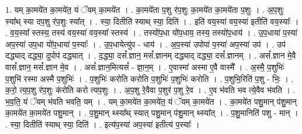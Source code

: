 \documentclass[17pt]{extarticle}
\begin{document}
1. यम् का॒मये॑त का॒मये॑त॒ यं ॅयम् का॒मये॑त । . का॒मये॑ता प॒शु र॑प॒शुः का॒मये॑त का॒मये॑ता प॒शुः । . अ॒प॒शुः स्या᳚थ् स्या दप॒शु र॑प॒शुः स्या᳚त् । . स्या॒ दितीति॑ स्याथ् स्या॒ दिति॑ । . इति॑ वय॒स्या॑ वय॒स्या॑ इतीति॑ वय॒स्याः᳚ । . व॒य॒स्या᳚ स्तस्य॒ तस्य॑ वय॒स्या॑ वय॒स्या᳚ स्तस्य॑ । . तस्यो॑प॒धा यो॑प॒धाय॒ तस्य॒ तस्यो॑प॒धाय॑ । . उ॒प॒धाया॑ प॒स्या॑ अप॒स्या॑ उप॒धा यो॑प॒धाया॑ प॒स्याः᳚ । . उ॒प॒धायेत्यु॑प - धाय॑ । . अ॒प॒स्या॑ उपोपा॑ प॒स्या॑ अप॒स्या॑ उप॑ । . उप॑ दद्ध्याद् दद्ध्या॒ दुपोप॑ दद्ध्यात् । . द॒द्ध्या॒ दसं᳚.ज्ञान॒ मसं᳚.ज्ञानम् दद्ध्याद् दद्ध्या॒ दसं᳚.ज्ञानम् । . असं᳚.ज्ञान मे॒वै वासं᳚.ज्ञान॒ मसं᳚.ज्ञान मे॒व । . असं᳚.ज्ञान॒मित्यसं᳚ - ज्ञा॒न॒म् । . ए॒वास्मा॑ अस्मा ए॒वै वास्मै᳚ । . अ॒स्मै॒ प॒शुभिः॑ प॒शुभि॑ रस्मा अस्मै प॒शुभिः॑ । . प॒शुभिः॑ करोति करोति प॒शुभिः॑ प॒शुभिः॑ करोति । . प॒शुभि॒रिति॑ प॒शु - भिः॒ । . क॒रो॒ त्य॒प॒शु र॑प॒शुः क॑रोति करो त्यप॒शुः । . अ॒प॒शु रे॒वैवा प॒शुर॑ प॒शु रे॒व । . ए॒व भ॑वति भव त्ये॒वैव भ॑वति । . भ॒व॒ति॒ यं ॅयम् भ॑वति भवति॒ यम् । . यम् का॒मये॑त का॒मये॑त॒ यं ॅयम् का॒मये॑त । . का॒मये॑त पशु॒मान् प॑शु॒मान् का॒मये॑त का॒मये॑त पशु॒मान् । . प॒शु॒मान् थ्स्या᳚थ् स्यात् पशु॒मान् प॑शु॒मान् थ्स्या᳚त् । . प॒शु॒मानिति॑ पशु - मान् । . स्या॒ दितीति॑ स्याथ् स्या॒ दिति॑ । . इत्य॑प॒स्या॑ अप॒स्या॑ इतीत्य॑ प॒स्याः᳚ । \newline
\end{document}
